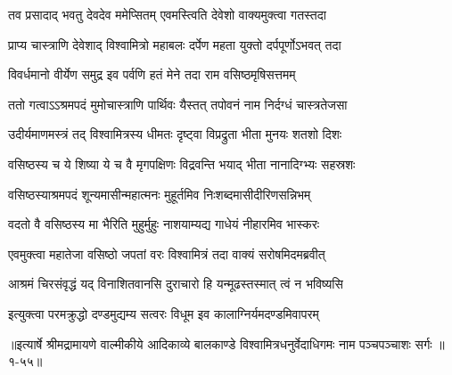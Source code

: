 \twolineshloka
{तव प्रसादाद् भवतु देवदेव ममेप्सितम्}
{एवमस्त्विति देवेशो वाक्यमुक्त्वा गतस्तदा} %

\twolineshloka
{प्राप्य चास्त्राणि देवेशाद् विश्वामित्रो महाबलः}
{दर्पेण महता युक्तो दर्पपूर्णोऽभवत् तदा} %

\twolineshloka
{विवर्धमानो वीर्येण समुद्र इव पर्वणि}
{हतं मेने तदा राम वसिष्ठमृषिसत्तमम्} %

\twolineshloka
{ततो गत्वाऽऽश्रमपदं मुमोचास्त्राणि पार्थिवः}
{यैस्तत् तपोवनं नाम निर्दग्धं चास्त्रतेजसा} %

\twolineshloka
{उदीर्यमाणमस्त्रं तद् विश्वामित्रस्य धीमतः}
{दृष्ट्वा विप्रद्रुता भीता मुनयः शतशो दिशः} %

\twolineshloka
{वसिष्ठस्य च ये शिष्या ये च वै मृगपक्षिणः}
{विद्रवन्ति भयाद् भीता नानादिग्भ्यः सहस्रशः} %

\twolineshloka
{वसिष्ठस्याश्रमपदं शून्यमासीन्महात्मनः}
{मुहूर्तमिव निःशब्दमासीदीरिणसन्निभम्} %

\twolineshloka
{वदतो वै वसिष्ठस्य मा भैरिति मुहुर्मुहुः}
{नाशयाम्यद्य गाधेयं नीहारमिव भास्करः} %

\twolineshloka
{एवमुक्त्वा महातेजा वसिष्ठो जपतां वरः}
{विश्वामित्रं तदा वाक्यं सरोषमिदमब्रवीत्} %

\twolineshloka
{आश्रमं चिरसंवृद्धं यद् विनाशितवानसि}
{दुराचारो हि यन्मूढस्तस्मात् त्वं न भविष्यसि} %

\twolineshloka
{इत्युक्त्वा परमक्रुद्धो दण्डमुद्यम्य सत्वरः}
{विधूम इव कालाग्निर्यमदण्डमिवापरम्} %


॥इत्यार्षे श्रीमद्रामायणे वाल्मीकीये आदिकाव्ये बालकाण्डे विश्वामित्रधनुर्वेदाधिगमः नाम पञ्चपञ्चाशः सर्गः ॥१-५५॥
